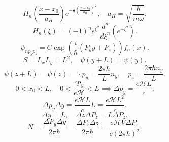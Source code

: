 \documentclass[a4paper]{article}
\begin{document}
\begin{sol}
\[	H_n\left( \frac{x-x_0}{a_H} \right) e^{-\frac{1}{2} \left( \frac{x-x_0}{a_H} \right) ^2},\quad a_H= \sqrt{\frac{\hbar}{m\omega}} 
.\] 
\[
	H_n(\xi)= (-1)^n e^{\xi^2} \frac{d^n}{d\xi^n} \left( e^{-\xi^2} \right) 
.\]
\[
	\psi_{np_y p_z}= C \exp \left( \frac{i}{\hbar }\left( P_y y+P_z \right)  \right) f_n(x)
.\] 
\[
	S=L_x L_y=L^2,\quad \psi(y+L)=\psi(y)
.\] 
\[
	\psi(z+L)= \psi(z) \implies p_y = \frac{2\pi \hbar }{L}n_y,\quad p_z= \frac{2\pi \hbar n_y}{L}
.\] 
\[
	0<x_0<L,\quad 0< \frac{c p_y}{e\mathcal{H}}<L\implies
	\Delta p_y= \frac{e\mathcal{H} L}{c}
.\] 
\[
	\Delta p_y \Delta y= \frac{e\mathcal{H} L}{c} L=
	\frac{e \mathcal{H} L^2}{c}
.\] 
\[
\Delta y=L,\quad \Delta z \Delta P_z= L\Delta P_z
.\] 
\[
	N= \frac{\Delta P_y \Delta y}{2\pi \hbar }= \frac{\Delta P_z \Delta z}{2\pi \hbar }= \frac{e \mathcal{H} V \Delta P_z}{c(2\pi \hbar)^2}
.\] 
\end{sol}
\end{document}
